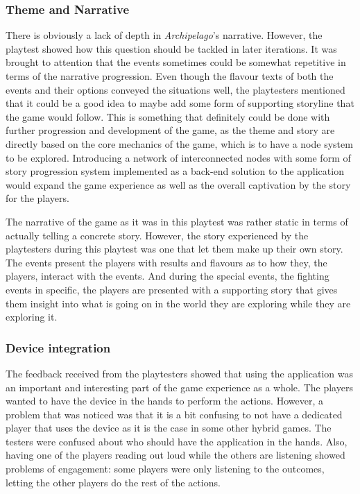 \subsubsection{Theme and Narrative}
There is obviously a lack of depth in \textit{Archipelago}'s narrative. However, the playtest showed how this question should be tackled in later iterations. It was brought to attention that the events sometimes could be somewhat repetitive in terms of the narrative progression. Even though the flavour texts of both the events and their options conveyed the situations well, the playtesters mentioned that it could be a good idea to maybe add some form of supporting storyline that the game would follow.
This is something that definitely could be done with further progression and development of the game, as the theme and story are directly based on the core mechanics of the game, which is to have a node system to be explored. Introducing a network of interconnected nodes with some form of story progression system implemented as a back-end solution to the application would expand the game experience as well as the overall captivation by the story for the players.

The narrative of the game as it was in this playtest was rather static in terms of actually telling a concrete story. However, the story experienced by the playtesters during this playtest was one that let them make up their own story. The events present the players with results and flavours as to how they, the players, interact with the events. And during the special events, the fighting events in specific, the players are presented with a supporting story that gives them insight into what is going on in the world they are exploring while they are exploring it.

\subsubsection{Device integration}
The feedback received from the playtesters showed that using the application was an important and interesting part of the game experience as a whole. The players wanted to have the device in the hands to perform the actions. However, a problem that was noticed was that it is a bit confusing to not have a dedicated player that uses the device as it is the case in some other hybrid games. The testers were confused about who should have the application in the hands. Also, having one of the players reading out loud while the others are listening showed problems of engagement: some players were only listening to the outcomes, letting the other players do the rest of the actions.

